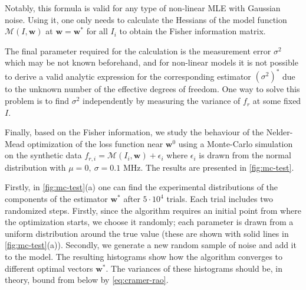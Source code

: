\documentclass[%
 aip,
 draft,
 amsmath,amssymb,
 reprint,%
]{revtex4-1}
\begin{document}
Notably, this formula is valid for any type of non-linear MLE with Gaussian noise. Using it, one only needs to calculate the Hessians of the model function $\mathcal{M}(I, \mathbf{w})$ at $\mathbf{w}=\mathbf{w}^*$ for all $I_i$ to obtain the Fisher information matrix.

The final parameter required for the calculation is the measurement error $\sigma^2$ which may be not known beforehand, and for non-linear models it is not possible\cite{ye1998, andrae2010} to derive a valid analytic expression for the corresponding estimator $(\sigma^2)^*$ due to the unknown number of the effective degrees of freedom. One way to solve this problem is to find $\sigma^2$ independently by measuring the variance of $f_r$ at some fixed $I$. 

Finally,  based on the Fisher information, we study the behaviour of the Nelder-Mead optimization of the loss function near $\mathbf{w}^0$ using a Monte-Carlo simulation on the synthetic data  $f_{r,i} = \mathcal{M}(I_i, \mathbf{w}) + \epsilon_i$ where $\epsilon_i$ is drawn from the normal distribution with $\mu=0,\ \sigma=0.1$ MHz. The results are presented in 
\autoref{fig:mc-test}. 

Firstly, in \autoref{fig:mc-test}(a) one can find the experimental distributions of the components of the estimator $\mathbf{w}^*$ after $5\cdot 10^4$ trials. Each trial includes two randomized steps. Firstly, since the algorithm requires an initial point from where the optimization starts, we choose it randomly; each parameter is drawn from a uniform distribution around the true value (these are shown with solid lines in \autoref{fig:mc-test}(a)). Secondly, we generate a new random sample of noise and add it to the model. The resulting histograms show how the algorithm converges to different optimal vectors $\mathbf{w}^*$. The variances of these histograms should be, in theory, bound from below by \eqref{eq:cramer-rao}.
\end{document}
